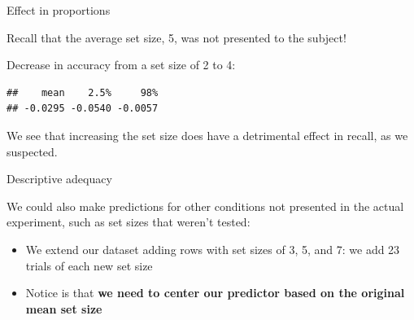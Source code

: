 \documentclass[12pt,ignorenonframetext,aspectratio=169]{beamer}
\newenvironment{Shaded}{\begin{snugshade}}{\end{snugshade}}
\newcommand{\DataTypeTok}[1]{\textcolor[rgb]{0.13,0.29,0.53}{#1}}
\newcommand{\DecValTok}[1]{\textcolor[rgb]{0.00,0.00,0.81}{#1}}
\newcommand{\FloatTok}[1]{\textcolor[rgb]{0.00,0.00,0.81}{#1}}
\newcommand{\KeywordTok}[1]{\textcolor[rgb]{0.13,0.29,0.53}{\textbf{#1}}}
\newcommand{\NormalTok}[1]{#1}
\newcommand{\OperatorTok}[1]{\textcolor[rgb]{0.81,0.36,0.00}{\textbf{#1}}}
\newcommand{\StringTok}[1]{\textcolor[rgb]{0.31,0.60,0.02}{#1}}
\begin{document}
\begin{frame}[fragile]{Effect in proportions}
\protect\hypertarget{effect-in-proportions-2}{}

Recall that the average set size, 5, was not presented to the subject!

Decrease in accuracy from a set size of 2 to 4:

\small

\begin{Shaded}
\end{Shaded}

\begin{verbatim}
##    mean    2.5%     98% 
## -0.0295 -0.0540 -0.0057
\end{verbatim}

\normalsize

We see that increasing the set size does have a detrimental effect in recall, as we suspected.

\end{frame}

\begin{frame}{Descriptive adequacy}
\protect\hypertarget{descriptive-adequacy}{}

We could also make predictions for other conditions not presented in the actual experiment, such as set sizes that weren't tested:

\begin{itemize}
\item
  We extend our dataset adding rows with set sizes of 3, 5, and 7: we add 23 trials of each new set size
\item
  Notice is that \textbf{we need to center our predictor based on the original mean set size}
\end{itemize}

\end{frame}
\end{document}
